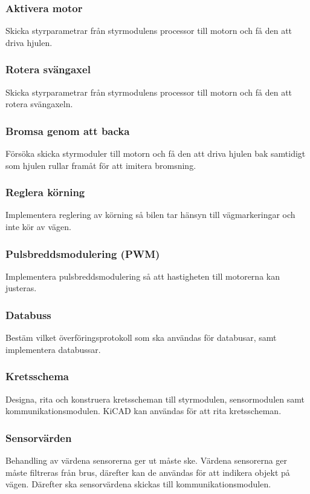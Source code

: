 \documentclass[projektplan/plan.tex]{subfiles}
\begin{document}
\subsubsection*{Aktivera motor}
Skicka styrparametrar från styrmodulens processor till motorn och få den att
driva hjulen.

\subsubsection*{Rotera svängaxel}
Skicka styrparametrar från styrmodulens processor till motorn och få den att
rotera svängaxeln.

\subsubsection*{Bromsa genom att backa}
Försöka skicka styrmoduler till motorn och få den att driva hjulen bak
samtidigt som hjulen rullar framåt för att imitera bromsning.

\subsubsection*{Reglera körning}
Implementera reglering av körning så bilen tar hänsyn till vägmarkeringar och
inte kör av vägen.

\subsubsection*{Pulsbreddsmodulering (PWM)}
Implementera pulsbreddsmodulering så att hastigheten till motorerna kan
justeras.

\subsubsection*{Databuss}
Bestäm vilket överföringsprotokoll som ska användas för databusar, samt
implementera databussar.

\subsubsection*{Kretsschema}
Designa, rita och konstruera kretsscheman till styrmodulen, sensormodulen samt
kommunikationsmodulen. KiCAD kan användas för att rita kretsscheman.

\subsubsection*{Sensorvärden}
Behandling av värdena sensorerna ger ut måste ske. Värdena sensorerna ger måste
filtreras från brus, därefter kan de användas för att indikera objekt på vägen.
Därefter ska sensorvärdena skickas till kommunikationsmodulen.
\end{document}
